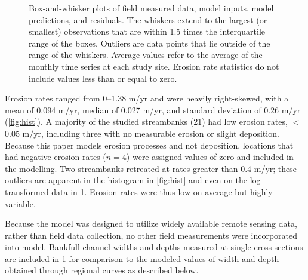 \documentclass[preprint, review, authoryear, 12pt]{elsarticle}
\begin{document}
\begin{figure}
\centering
{}
\caption{Box-and-whisker plots of field measured data, model inputs, model predictions, and residuals. The whiskers extend to the largest (or smallest) observations that are within 1.5 times the interquartile range of the boxes. Outliers are data points that lie outside of the range of the whiskers. Average values refer to the average of the monthly time series at each study site. Erosion rate statistics do not include values less than or equal to zero.}\label{fig:boxplots}
\end{figure}

Erosion rates ranged from 0--1.38 m/yr and were heavily right-skewed, with a mean of 0.094 m/yr, median of 0.027 m/yr, and standard deviation of 0.26 m/yr (\cref{fig:hist}). A majority of the studied streambanks (21) had low erosion rates, $<$0.05 m/yr, including three with no measurable erosion or slight deposition.  Because this paper models erosion processes and not deposition, locations that had negative erosion rates ($n=4$) were assigned values of zero and included in the modelling. Two streambanks retreated at rates greater than 0.4 m/yr; these outliers are apparent in the histogram in \cref{fig:hist} and even on the log-transformed data in \cref{fig:boxplots}. Erosion rates were thus low on average but highly variable. 

Because the model was designed to utilize widely available remote sensing data, rather than field data collection, no other field measurements were incorporated into model. Bankfull channel widths and depths measured at single cross-sections are included in \cref{fig:boxplots} for comparison to the modeled values of width and depth obtained through regional curves as described below.
\end{document}
